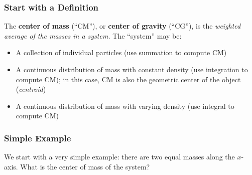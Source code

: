 \documentclass[12pt,compress,aspectratio=169]{beamer}
\begin{document}
\begin{frame}
  \frametitle{Start with a Definition}
  The \textbf{center of mass} (``CM''), or \textbf{center of gravity} (``CG''),
  is the \emph{weighted average of the masses in a system.} The ``system'' may
  be:
  \begin{itemize}
  \item A collection of individual particles (use summation to compute CM)
  \item A continuous distribution of mass with constant density (use
    integration to compute CM); in this case, CM is also the geometric center
    of the object (\emph{centroid})
  \item A continuous distribution of mass with varying density (use integral to
    compute CM)
  \end{itemize}
\end{frame}


\begin{frame}
  \frametitle{Simple Example}
  We start with a very simple example: there are two equal masses along the
  $x$-axis. What is the center of mass of the system?
    
  \vspace{.25in}
  \begin{center}
  \end{center}
  \vspace{.2in}

\end{frame}
\end{document}

